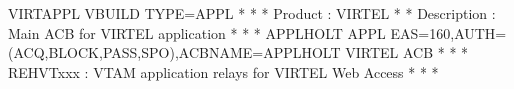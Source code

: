 \documentclass[letterpaper,10pt,english]{sphinxmanual}
\begin{document}
\begin{sphinxVerbatim}[commandchars=\\\{\}]
VIRTAPPL VBUILD TYPE=APPL
* \PYGZhy{}\PYGZhy{}\PYGZhy{}\PYGZhy{}\PYGZhy{}\PYGZhy{}\PYGZhy{}\PYGZhy{}\PYGZhy{}\PYGZhy{}\PYGZhy{}\PYGZhy{}\PYGZhy{}\PYGZhy{}\PYGZhy{}\PYGZhy{}\PYGZhy{}\PYGZhy{}\PYGZhy{}\PYGZhy{}\PYGZhy{}\PYGZhy{}\PYGZhy{}\PYGZhy{}\PYGZhy{}\PYGZhy{}\PYGZhy{}\PYGZhy{}\PYGZhy{}\PYGZhy{}\PYGZhy{}\PYGZhy{}\PYGZhy{}\PYGZhy{}\PYGZhy{}\PYGZhy{}\PYGZhy{}\PYGZhy{}\PYGZhy{}\PYGZhy{}\PYGZhy{}\PYGZhy{}\PYGZhy{}\PYGZhy{}\PYGZhy{}\PYGZhy{}\PYGZhy{}\PYGZhy{}\PYGZhy{}\PYGZhy{}\PYGZhy{}\PYGZhy{}\PYGZhy{}\PYGZhy{}\PYGZhy{}\PYGZhy{}\PYGZhy{}\PYGZhy{}\PYGZhy{}\PYGZhy{}\PYGZhy{}\PYGZhy{}\PYGZhy{}\PYGZhy{}\PYGZhy{}\PYGZhy{} *
* Product     :  VIRTEL                                              *
* Description :  Main ACB for VIRTEL application                     *
* \PYGZhy{}\PYGZhy{}\PYGZhy{}\PYGZhy{}\PYGZhy{}\PYGZhy{}\PYGZhy{}\PYGZhy{}\PYGZhy{}\PYGZhy{}\PYGZhy{}\PYGZhy{}\PYGZhy{}\PYGZhy{}\PYGZhy{}\PYGZhy{}\PYGZhy{}\PYGZhy{}\PYGZhy{}\PYGZhy{}\PYGZhy{}\PYGZhy{}\PYGZhy{}\PYGZhy{}\PYGZhy{}\PYGZhy{}\PYGZhy{}\PYGZhy{}\PYGZhy{}\PYGZhy{}\PYGZhy{}\PYGZhy{}\PYGZhy{}\PYGZhy{}\PYGZhy{}\PYGZhy{}\PYGZhy{}\PYGZhy{}\PYGZhy{}\PYGZhy{}\PYGZhy{}\PYGZhy{}\PYGZhy{}\PYGZhy{}\PYGZhy{}\PYGZhy{}\PYGZhy{}\PYGZhy{}\PYGZhy{}\PYGZhy{}\PYGZhy{}\PYGZhy{}\PYGZhy{}\PYGZhy{}\PYGZhy{}\PYGZhy{}\PYGZhy{}\PYGZhy{}\PYGZhy{}\PYGZhy{}\PYGZhy{}\PYGZhy{}\PYGZhy{}\PYGZhy{}\PYGZhy{}\PYGZhy{} *
APPLHOLT APPL  EAS=160,AUTH=(ACQ,BLOCK,PASS,SPO),ACBNAME=APPLHOLT               \PYGZlt{}\PYGZhy{}\PYGZhy{}\PYGZhy{}\PYGZhy{} VIRTEL ACB
* \PYGZhy{}\PYGZhy{}\PYGZhy{}\PYGZhy{}\PYGZhy{}\PYGZhy{}\PYGZhy{}\PYGZhy{}\PYGZhy{}\PYGZhy{}\PYGZhy{}\PYGZhy{}\PYGZhy{}\PYGZhy{}\PYGZhy{}\PYGZhy{}\PYGZhy{}\PYGZhy{}\PYGZhy{}\PYGZhy{}\PYGZhy{}\PYGZhy{}\PYGZhy{}\PYGZhy{}\PYGZhy{}\PYGZhy{}\PYGZhy{}\PYGZhy{}\PYGZhy{}\PYGZhy{}\PYGZhy{}\PYGZhy{}\PYGZhy{}\PYGZhy{}\PYGZhy{}\PYGZhy{}\PYGZhy{}\PYGZhy{}\PYGZhy{}\PYGZhy{}\PYGZhy{}\PYGZhy{}\PYGZhy{}\PYGZhy{}\PYGZhy{}\PYGZhy{}\PYGZhy{}\PYGZhy{}\PYGZhy{}\PYGZhy{}\PYGZhy{}\PYGZhy{}\PYGZhy{}\PYGZhy{}\PYGZhy{}\PYGZhy{}\PYGZhy{}\PYGZhy{}\PYGZhy{}\PYGZhy{}\PYGZhy{}\PYGZhy{}\PYGZhy{}\PYGZhy{}\PYGZhy{}\PYGZhy{} *
* REHVTxxx    : VTAM application relays for VIRTEL Web Access        *
* \PYGZhy{}\PYGZhy{}\PYGZhy{}\PYGZhy{}\PYGZhy{}\PYGZhy{}\PYGZhy{}\PYGZhy{}\PYGZhy{}\PYGZhy{}\PYGZhy{}\PYGZhy{}\PYGZhy{}\PYGZhy{}\PYGZhy{}\PYGZhy{}\PYGZhy{}\PYGZhy{}\PYGZhy{}\PYGZhy{}\PYGZhy{}\PYGZhy{}\PYGZhy{}\PYGZhy{}\PYGZhy{}\PYGZhy{}\PYGZhy{}\PYGZhy{}\PYGZhy{}\PYGZhy{}\PYGZhy{}\PYGZhy{}\PYGZhy{}\PYGZhy{}\PYGZhy{}\PYGZhy{}\PYGZhy{}\PYGZhy{}\PYGZhy{}\PYGZhy{}\PYGZhy{}\PYGZhy{}\PYGZhy{}\PYGZhy{}\PYGZhy{}\PYGZhy{}\PYGZhy{}\PYGZhy{}\PYGZhy{}\PYGZhy{}\PYGZhy{}\PYGZhy{}\PYGZhy{}\PYGZhy{}\PYGZhy{}\PYGZhy{}\PYGZhy{}\PYGZhy{}\PYGZhy{}\PYGZhy{}\PYGZhy{}\PYGZhy{}\PYGZhy{}\PYGZhy{}\PYGZhy{}\PYGZhy{} *

\end{sphinxVerbatim}
\end{document}
